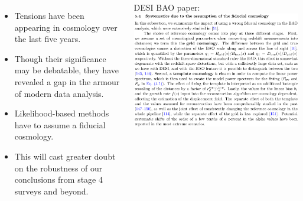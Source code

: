 \documentclass[aspectratio=169]{beamer}
\begin{document}
\begin{frame}
    \begin{columns}
        \begin{itemize}
            \item Tensions have been appearing in cosmology over the last five years.
            \item Though their significance may be debatable, they have revealed a gap in the armour of modern data analysis.
            \item Likelihood-based methods have to assume a fiducial cosmology. 
            \item This will cast greater doubt on the robustness of our conclusions from stage 4 surveys and beyond.
        \end{itemize}
        \begin{block}{\tiny DESI BAO paper: }
            \includegraphics[width=\textwidth]{figures/desi_fiducial.pdf}
        \end{block}
    \end{columns}

\end{frame}
\end{document}
